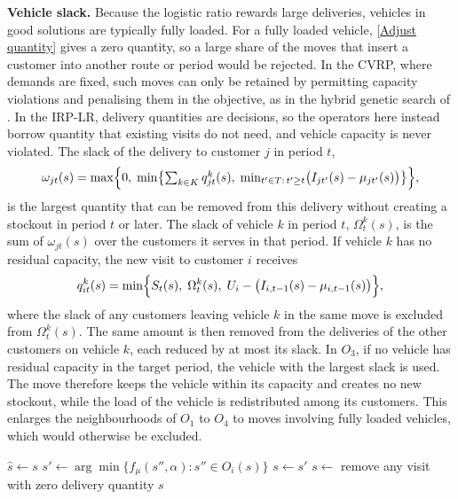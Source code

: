 \documentclass{article}
\begin{document}
\textbf{Vehicle slack.} Because the logistic ratio rewards large deliveries, vehicles in good solutions are typically fully loaded. For a fully loaded vehicle, \eqref{Adjust quantity} gives a zero quantity, so a large share of the moves that insert a customer into another route or period would be rejected. In the CVRP, where demands are fixed, such moves can only be retained by permitting capacity violations and penalising them in the objective, as in the hybrid genetic search of \cite{vidal2022hybrid}. In the IRP-LR, delivery quantities are decisions, so the operators here instead borrow quantity that existing visits do not need, and vehicle capacity is never violated. The slack of the delivery to customer $j$ in period $t$,
\begin{equation}
\omega_{jt}(s)=\max\Bigl\{0,\;\min\bigl\{\textstyle\sum_{k\in K}q^k_{jt}(s),\;\min_{t'\in T:\,t'\geq t}\bigl(I_{jt'}(s)-\mu_{jt'}(s)\bigr)\bigr\}\Bigr\},\label{visit slack}
\end{equation}
is the largest quantity that can be removed from this delivery without creating a stockout in period $t$ or later. The slack of vehicle $k$ in period $t$, $\Omega^k_t(s)$, is the sum of $\omega_{jt}(s)$ over the customers it serves in that period. If vehicle $k$ has no residual capacity, the new visit to customer $i$ receives
\begin{equation*}
q^k_{it}(s)=\min\Bigl\{S_t(s),\;\Omega^k_t(s),\;U_i-\bigl(I_{i,t-1}(s)-\mu_{i,t-1}(s)\bigr)\Bigr\},
\end{equation*}
where the slack of any customers leaving vehicle $k$ in the same move is excluded from $\Omega^k_t(s)$. The same amount is then removed from the deliveries of the other customers on vehicle $k$, each reduced by at most its slack. In $O_3$, if no vehicle has residual capacity in the target period, the vehicle with the largest slack is used. The move therefore keeps the vehicle within its capacity and creates no new stockout, while the load of the vehicle is redistributed among its customers. This enlarges the neighbourhoods of $O_1$ to $O_4$ to moves involving fully loaded vehicles, which would otherwise be excluded.

\begin{algorithm}
\captionsetup{labelformat=empty}
\caption{\textbf{Local Search$(s,\alpha)$}} \label{alg:LocalSearch}
\begin{algorithmic}[1]
 \label{search: for}
    \REPEAT \label{search: repeat N}
        \STATE $\hat{s} \gets s$
        \STATE $s' \gets \arg\min\{f_{\mu}(s'',\alpha): s''\in O_i(s)\}$
            \STATE $s \gets s'$
        \ENDIF
     \label{search: until N}
\ENDFOR \label{search: endfor}
\STATE $s\gets $ remove any visit with zero delivery quantity
\RETURN $s$
\end{algorithmic}
\end{algorithm}
\end{document}

